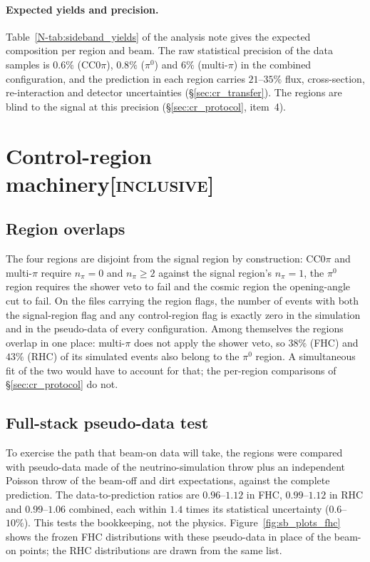 \documentclass[11pt,a4paper]{article}
\newcommand{\noteref}[2]{#1~\ref{N-#2} of the analysis note}
\newcommand{\scopetag}[1]{\hfill{\normalfont\small\textsc{[#1]}}}
\begin{document}
\paragraph{Expected yields and precision.}
\noteref{Table}{tab:sideband_yields} gives the expected composition per region and beam. The raw
statistical precision of the data samples is $0.6\%$ (CC$0\pi$), $0.8\%$ ($\pi^0$) and $6\%$ (multi-$\pi$) in
the combined configuration, and the prediction in each region carries $21$--$35\%$ flux, cross-section,
re-interaction and detector uncertainties (\S\ref{sec:cr_transfer}). The regions are blind to the signal
at this precision (\S\ref{sec:cr_protocol}, item~4).


\section[Control-region machinery]{Control-region machinery\scopetag{inclusive}}
\label{sec:cr_machinery}

\subsection{Region overlaps}
\label{sec:cr_overlap}
The four regions are disjoint from the signal region by construction: CC$0\pi$ and multi-$\pi$ require
$n_\pi=0$ and $n_\pi\ge2$ against the signal region's $n_\pi=1$, the $\pi^0$ region requires the shower
veto to fail and the cosmic region the opening-angle cut to fail. On the files carrying the region
flags, the number of events with both the signal-region flag and any control-region flag is exactly zero
in the simulation and in the pseudo-data of every configuration. Among themselves the regions overlap in
one place: multi-$\pi$ does not apply the shower veto, so $38\%$ (FHC) and $43\%$ (RHC) of its
simulated events also belong to the $\pi^0$ region. A simultaneous fit of the two would have to account
for that; the per-region comparisons of \S\ref{sec:cr_protocol} do not.

\subsection{Full-stack pseudo-data test}
\label{sec:cr_fullstack}
To exercise the path that beam-on data will take, the regions were compared with pseudo-data made of the
neutrino-simulation throw plus an independent Poisson throw of the beam-off and dirt expectations,
against the complete prediction. The data-to-prediction ratios are $0.96$--$1.12$ in FHC, $0.99$--$1.12$
in RHC and $0.99$--$1.06$ combined, each within $1.4$ times its statistical uncertainty ($0.6$--$10\%$). This tests
the bookkeeping, not the physics. Figure~\ref{fig:sb_plots_fhc} shows the frozen FHC distributions
with these pseudo-data in place of the beam-on points; the RHC distributions are drawn from the same
list.
\end{document}
